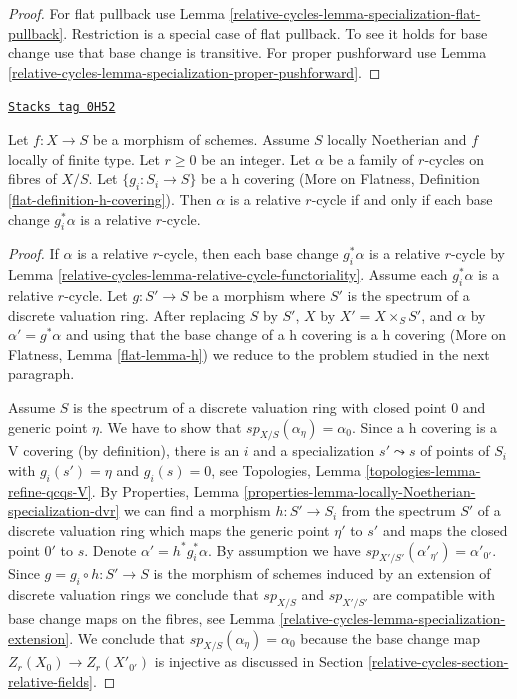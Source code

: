 \begin{proof}
For flat pullback use Lemma \ref{relative-cycles-lemma-specialization-flat-pullback}.
Restriction is a special case of flat pullback. To see it holds for
base change use that base change is transitive.
For proper pushforward use Lemma \ref{relative-cycles-lemma-specialization-proper-pushforward}.
\end{proof}

\begin{lemma}
\label{relative-cycles-lemma-relative-cycles-h-descent}
\href{https://stacks.math.columbia.edu/tag/0H52}{\texttt{Stacks tag 0H52}}

Let $f : X \to S$ be a morphism of schemes. Assume $S$ locally Noetherian
and $f$ locally of finite type. Let $r \geq 0$ be an integer. Let $\alpha$
be a family of $r$-cycles on fibres of $X/S$. Let $\{g_i : S_i \to S\}$
be a h covering (More on Flatness, Definition
\ref{flat-definition-h-covering}). Then $\alpha$ is a relative $r$-cycle
if and only if each base change $g_i^*\alpha$ is a relative $r$-cycle.
\end{lemma}

\begin{proof}
If $\alpha$ is a relative $r$-cycle, then each base change $g_i^*\alpha$ is a
relative $r$-cycle by Lemma \ref{relative-cycles-lemma-relative-cycle-functoriality}.
Assume each $g_i^*\alpha$ is a relative $r$-cycle.
Let $g : S' \to S$ be a morphism where $S'$ is the spectrum of a discrete
valuation ring. After replacing $S$ by $S'$, $X$ by $X' = X \times_S S'$, and
$\alpha$ by $\alpha' = g^*\alpha$ and using that the base change of a
h covering is a h covering (More on Flatness, Lemma \ref{flat-lemma-h})
we reduce to the problem studied in the next paragraph.

\medskip\noindent
Assume $S$ is the spectrum of a discrete valuation ring with closed
point $0$ and generic point $\eta$. We have to show that
$sp_{X/S}(\alpha_\eta) = \alpha_0$. Since a h covering is a V covering
(by definition), there is an $i$ and a specialization $s' \leadsto s$
of points of $S_i$ with $g_i(s') = \eta$ and $g_i(s) = 0$, see
Topologies, Lemma \ref{topologies-lemma-refine-qcqs-V}. By
Properties, Lemma \ref{properties-lemma-locally-Noetherian-specialization-dvr}
we can find a morphism $h : S' \to S_i$ from the
spectrum $S'$ of a discrete valuation ring which maps
the generic point $\eta'$ to $s'$ and maps
the closed point $0'$ to $s$. Denote $\alpha' = h^*g_i^*\alpha$.
By assumption we have $sp_{X'/S'}(\alpha'_{\eta'}) = \alpha'_{0'}$.
Since $g = g_i \circ h : S' \to S$ is the morphism of schemes
induced by an extension of discrete valuation rings we conclude that
$sp_{X/S}$ and $sp_{X'/S'}$ are compatible with base change maps
on the fibres, see Lemma \ref{relative-cycles-lemma-specialization-extension}.
We conclude that $sp_{X/S}(\alpha_\eta) = \alpha_0$ because
the base change map $Z_r(X_0) \to Z_r(X'_{0'})$ is injective
as discussed in Section \ref{relative-cycles-section-relative-fields}.
\end{proof}

